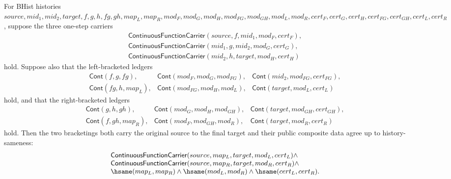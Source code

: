 \begin{theorem}
\label{thm:continuous-function-carrier-triple-composition-certificate-synchronization}
For BHist histories $source,mid_1,mid_2,target,f,g,h,fg,gh,map_L,map_R,
mod_F,mod_G,mod_H,mod_{FG},mod_{GH},mod_L,mod_R,cert_F,cert_G,cert_H,
cert_{FG},cert_{GH},cert_L,cert_R$, suppose the three one-step carriers
$$
\begin{array}{l}
\mathsf{ContinuousFunctionCarrier}(source,f,mid_1,mod_F,cert_F),\\
\mathsf{ContinuousFunctionCarrier}(mid_1,g,mid_2,mod_G,cert_G),\\
\mathsf{ContinuousFunctionCarrier}(mid_2,h,target,mod_H,cert_H)
\end{array}
$$
hold. Suppose also that the left-bracketed ledgers
$$
\begin{array}{lll}
\mathsf{Cont}(f,g,fg),&
\mathsf{Cont}(mod_F,mod_G,mod_{FG}),&
\mathsf{Cont}(mid_2,mod_{FG},cert_{FG}),\\
\mathsf{Cont}(fg,h,map_L),&
\mathsf{Cont}(mod_{FG},mod_H,mod_L),&
\mathsf{Cont}(target,mod_L,cert_L)
\end{array}
$$
hold, and that the right-bracketed ledgers
$$
\begin{array}{lll}
\mathsf{Cont}(g,h,gh),&
\mathsf{Cont}(mod_G,mod_H,mod_{GH}),&
\mathsf{Cont}(target,mod_{GH},cert_{GH}),\\
\mathsf{Cont}(f,gh,map_R),&
\mathsf{Cont}(mod_F,mod_{GH},mod_R),&
\mathsf{Cont}(target,mod_R,cert_R)
\end{array}
$$
hold. Then the two bracketings both carry the original source to the final
target and their public composite data agree up to history-sameness:
$$
\begin{array}{l}
\mathsf{ContinuousFunctionCarrier}(source,map_L,target,mod_L,cert_L)\land\\
\mathsf{ContinuousFunctionCarrier}(source,map_R,target,mod_R,cert_R)\land\\
\hsame(map_L,map_R)\land\hsame(mod_L,mod_R)\land\hsame(cert_L,cert_R).
\end{array}
$$
\end{theorem}
